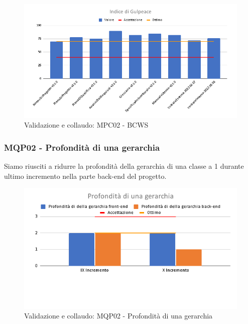 \begin{figure}[H]
    \centering
    \includegraphics[scale=0.50]{Sezioni/images/last_prodotto/Indice_di_Gulpeace.png}
    \caption{Validazione e collaudo: MPC02 - BCWS}
\end{figure}
\subsubsection{MQP02 - Profondità di una gerarchia}
Siamo riusciti a ridurre la profondità della gerarchia di una classe a 1 durante ultimo incremento nella parte back-end del progetto.
\begin{figure}[H]
    \centering
    \includegraphics[scale=0.50]{Sezioni/images/last_prodotto/Profondita_di_una_gerarchia.png}
    \caption{Validazione e collaudo: MQP02 - Profondità di una gerarchia}
\end{figure}
